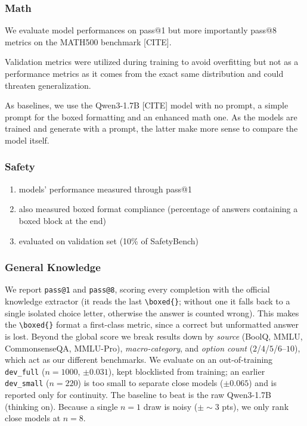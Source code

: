 \documentclass[11pt]{article}
\begin{document}
\subsubsection{Math}

    We evaluate model performances on pass@1 but more importantly pass@8 metrics on the MATH500 benchmark [CITE].

    Validation metrics were utilized during training to avoid overfitting but not as a performance metrics as it comes from the exact same distribution and could threaten generalization. 

    As baselines, we use the Qwen3-1.7B [CITE] model with no prompt, a simple prompt for the boxed formatting and an enhanced math one. As the models are trained and generate with a prompt, the latter make more sense to compare the model itself. 


\subsubsection{Safety}

\begin{enumerate}
    \item models' performance measured through pass@1
    \item also measured boxed format compliance (percentage of answers containing a boxed{} block at the end)
    \item evaluated on validation set (10\% of SafetyBench)
    
\end{enumerate}

\subsubsection{General Knowledge}

    We report \texttt{pass@1} and \texttt{pass@8}, scoring every completion with the official knowledge extractor (it reads the last \texttt{\textbackslash boxed\{\}}; without one it falls back to a single isolated choice letter, otherwise the answer is counted wrong). This makes the \texttt{\textbackslash boxed\{\}} format a first-class metric, since a correct but unformatted answer is lost. Beyond the global score we break results down by \emph{source} (BoolQ, MMLU, CommonsenseQA, MMLU-Pro), \emph{macro-category}, and \emph{option count} ($2$/$4$/$5$/$6$--$10$), which act as our different benchmarks. We evaluate on an out-of-training \texttt{dev\_full} ($n{=}1000$, $\pm0.031$), kept blocklisted from training; an earlier \texttt{dev\_small} ($n{=}220$) is too small to separate close models ($\pm0.065$) and is reported only for continuity. The baseline to beat is the raw Qwen3-1.7B (thinking on). Because a single $n{=}1$ draw is noisy ($\pm\sim3$ pts), we only rank close models at $n{=}8$.
\end{document}
